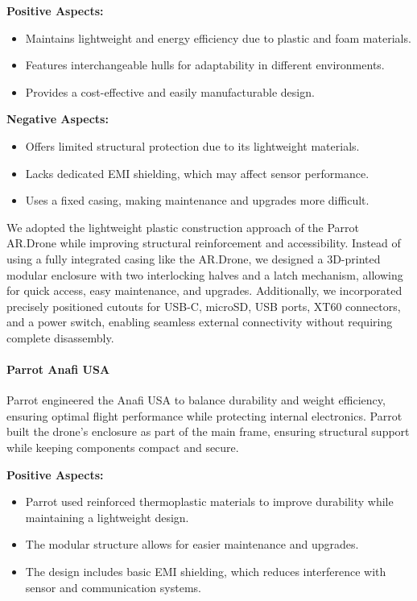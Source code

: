 \documentclass[12pt]{article}
\begin{document}
\textbf{Positive Aspects:}
\begin{itemize}
    \item Maintains lightweight and energy efficiency due to plastic and foam materials.
    \item Features interchangeable hulls for adaptability in different environments.
    \item Provides a cost-effective and easily manufacturable design.
\end{itemize}

\textbf{Negative Aspects:}
\begin{itemize}
    \item Offers limited structural protection due to its lightweight materials.
    \item Lacks dedicated EMI shielding, which may affect sensor performance.
    \item Uses a fixed casing, making maintenance and upgrades more difficult.
\end{itemize}

\par We adopted the lightweight plastic construction approach of the Parrot AR.Drone while improving structural reinforcement and accessibility. Instead of using a fully integrated casing like the AR.Drone, we designed a 3D-printed modular enclosure with two interlocking halves and a latch mechanism, allowing for quick access, easy maintenance, and upgrades. Additionally, we incorporated precisely positioned cutouts for USB-C, microSD, USB ports, XT60 connectors, and a power switch, enabling seamless external connectivity without requiring complete disassembly.

\paragraph{Parrot Anafi USA}

\par Parrot engineered the Anafi USA to balance durability and weight efficiency, ensuring optimal flight performance while protecting internal electronics. Parrot built the drone’s enclosure as part of the main frame, ensuring structural support while keeping components compact and secure.

\textbf{Positive Aspects:}
\begin{itemize}
    \item Parrot used reinforced thermoplastic materials to improve durability while maintaining a lightweight design.
    \item The modular structure allows for easier maintenance and upgrades.
    \item The design includes basic EMI shielding, which reduces interference with sensor and communication systems.
\end{itemize}
\end{document}
